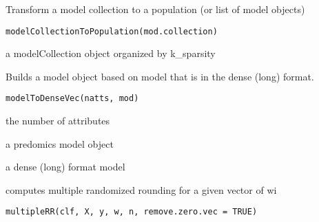 \documentclass[a4paper]{book}
\begin{document}
%
\begin{Description}
Transform a model collection to a population (or list of model objects)
\end{Description}
%
\begin{Usage}
\begin{verbatim}
modelCollectionToPopulation(mod.collection)
\end{verbatim}
\end{Usage}
%
\begin{Arguments}
\begin{ldescription}
\item[\code{mod.collection:}] a modelCollection object organized by k\_sparsity
\end{ldescription}
\end{Arguments}
%
\begin{Description}
Builds a model object based on model that is in the dense (long) format.
\end{Description}
%
\begin{Usage}
\begin{verbatim}
modelToDenseVec(natts, mod)
\end{verbatim}
\end{Usage}
%
\begin{Arguments}
\begin{ldescription}
\item[\code{natts:}] the number of attributes

\item[\code{mod:}] a predomics model object
\end{ldescription}
\end{Arguments}
%
\begin{Value}
a dense (long) format model
\end{Value}
%
\begin{Description}
computes multiple randomized rounding for a given vector of wi
\end{Description}
%
\begin{Usage}
\begin{verbatim}
multipleRR(clf, X, y, w, n, remove.zero.vec = TRUE)
\end{verbatim}
\end{Usage}
\end{document}
